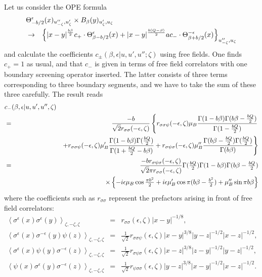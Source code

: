 \documentclass[a4paper,12pt]{article}
\newcommand{\vev}[1]{\left<{#1}\right>}
\newcommand{\tfrac}[2]{{\textstyle\frac{#1}{#2}}}
\newcommand{\ep}{{\epsilon}}
\begin{document}
   Let us consider the OPE formula
\begin{eqnarray}
\lefteqn{
  \Theta_{-b/2}^\ep(x)_{u''_{-\zeta},u'_\zeta} \times
  B_\beta(y)_{u'_\zeta,u_\zeta}
} \nonumber \\
 &\rightarrow&
  \left\{
  |x-y|^{\frac{b\beta}{2}}
  c_+\cdot\Theta_{\beta-b/2}^\ep(x)
 +|x-y|^{\frac{b(Q-\beta)}{2}}
  ac_-\cdot\Theta_{\beta+b/2}^{-\ep}(x)
  \right\}_{u''_{-\zeta},u_\zeta}
\end{eqnarray}
 and calculate the coefficients $c_\pm(\beta,\ep|u,u',u'';\zeta)$
 using free fields.
 One finds $c_+=1$ as usual, and that $c_-$ is given in terms of
 free field correlators with one boundary screening operator inserted.
 The latter consists of three terms corresponding to three
 boundary segments, and we have to take the sum of these three carefully.
 The result reads
\begin{eqnarray}
\lefteqn{  c_-(\beta,\ep|u,u',u'',\zeta) }
 \nonumber \\
 &=& \frac{-b}{\sqrt{2}r_{\sigma\sigma}(-\ep,\zeta)}
 \left\{
  r_{\sigma\sigma\psi}(-\ep,\zeta)\mu_B
  \frac{\Gamma(1-b\beta)\Gamma(b\beta-\frac{bQ}{2})}
       {\Gamma(1-\frac{bQ}{2})}
 \right. \nonumber \\ && \hskip24mm \left.
 +r_{\sigma\sigma\psi}(-\ep,\zeta)\mu'_B
  \frac{\Gamma(1-b\beta)\Gamma(\frac{bQ}{2})}
       {\Gamma(1+\frac{bQ}{2}-b\beta)}
 +r_{\sigma\psi\sigma}(-\ep,\zeta)\mu''_B
  \frac{\Gamma(b\beta-\frac{bQ}{2})\Gamma(\frac{bQ}{2})}
       {\Gamma(b\beta)}
 \right\} \nonumber \\
 &=& \frac{-b r_{\sigma\psi\sigma}(-\ep,\zeta)}
          {\sqrt{2}\pi r_{\sigma\sigma}(-\ep,\zeta)}
     \Gamma(\tfrac{bQ}{2})\Gamma(1-b\beta)\Gamma(b\beta-\tfrac{bQ}{2})
 \nonumber \\ && \times
 \left\{ -i\ep\mu_B\cos\tfrac{\pi b^2}{2}
         +i\ep\mu'_B\cos\pi(b\beta-\tfrac{b^2}{2})
         +\mu''_B\sin\pi b\beta
 \right\}
\end{eqnarray}
 where the coefficients such as $r_{\sigma\sigma}$ represent
 the prefactors arising in front of free field correlators:
\begin{equation}
\begin{array}{rcl}
  \vev{\sigma^\ep(x)\sigma^\ep(y)}_{\zeta,-\zeta,\zeta}
 &=& r_{\sigma\sigma}(\ep,\zeta)|x-y|^{-1/8}, \\
  \vev{\sigma^\ep(x)\sigma^{-\ep}(y)\psi(z)}_{\zeta,-\zeta,\zeta}
 &=& \tfrac{1}{\sqrt{2}}
     r_{\sigma\sigma\psi}(\ep,\zeta)|x-y|^{3/8}|y-z|^{-1/2}|x-z|^{-1/2},\\
  \vev{\sigma^\ep(x)\psi(y)\sigma^{-\ep}(z)}_{\zeta,-\zeta,\zeta}
 &=& \tfrac{1}{\sqrt{2}}
     r_{\sigma\psi\sigma}(\ep,\zeta)|x-z|^{3/8}|z-y|^{-1/2}|y-z|^{-1/2},\\
  \vev{\psi(x)\sigma^\ep(y)\sigma^{-\ep}(z)}_{\zeta,-\zeta,\zeta}
 &=& \tfrac{1}{\sqrt{2}}
     r_{\psi\sigma\sigma}(\ep,\zeta)|y-z|^{3/8}|x-y|^{-1/2}|x-z|^{-1/2}.
\end{array}
\end{equation}
\end{document}
